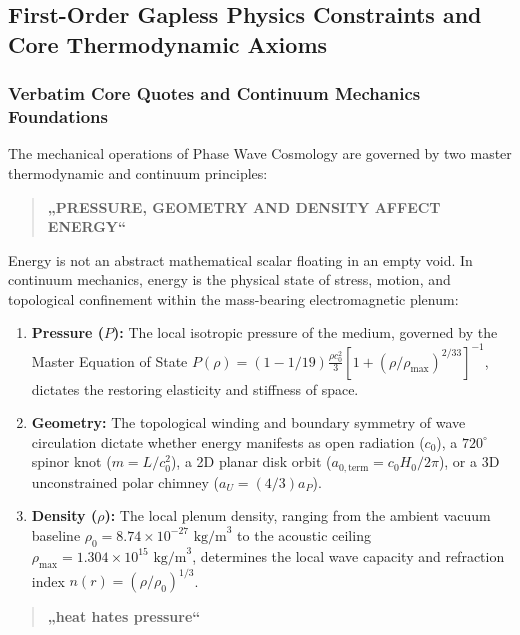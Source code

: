 \documentclass[11pt,a4paper]{article}
\begin{document}
\subsection{First-Order Gapless Physics Constraints and Core Thermodynamic Axioms}
\label{subsec:gapless_axioms_quotes}

\subsubsection{Verbatim Core Quotes and Continuum Mechanics Foundations}
\label{subsubsec:core_quotes_mechanics}

The mechanical operations of Phase Wave Cosmology are governed by two master thermodynamic and continuum principles:

\begin{quote}
\centering
\Large \textbf{„PRESSURE, GEOMETRY AND DENSITY AFFECT ENERGY“}
\end{quote}

Energy is not an abstract mathematical scalar floating in an empty void. In continuum mechanics, energy is the physical state of stress, motion, and topological confinement within the mass-bearing electromagnetic plenum:
\begin{enumerate}
    \item \textbf{Pressure ($P$):} The local isotropic pressure of the medium, governed by the Master Equation of State $P(\rho) = (1 - 1/19)\frac{\rho c_0^2}{3}[1 + (\rho/\rho_{\max})^{2/33}]^{-1}$, dictates the restoring elasticity and stiffness of space.
    \item \textbf{Geometry:} The topological winding and boundary symmetry of wave circulation dictate whether energy manifests as open radiation ($c_0$), a $720^\circ$ spinor knot ($m = L/c_0^2$), a 2D planar disk orbit ($a_{0,\text{term}} = c_0 H_0 / 2\pi$), or a 3D unconstrained polar chimney ($a_U = (4/3) a_P$).
    \item \textbf{Density ($\rho$):} The local plenum density, ranging from the ambient vacuum baseline $\rho_0 = 8.74 \times 10^{-27}\text{ kg/m}^3$ to the acoustic ceiling $\rho_{\max} = 1.304 \times 10^{15}\text{ kg/m}^3$, determines the local wave capacity and refraction index $n(r) = (\rho/\rho_0)^{1/3}$.
\end{enumerate}

\begin{quote}
\centering
\Large \textbf{„heat hates pressure“}
\end{quote}
\end{document}
